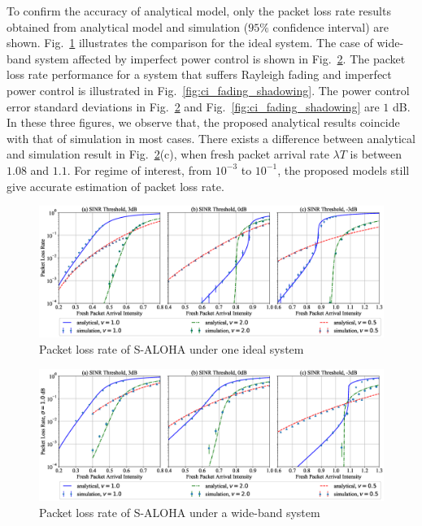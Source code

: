 To confirm the accuracy of analytical model, only the packet loss rate results obtained from analytical model and simulation ($95 \%$ confidence interval) are shown. Fig.~\ref{fig:ideal_ci} illustrates the comparison for the ideal system. The case of wide-band system affected by imperfect power control is shown in Fig.~\ref{fig:ci}. The packet loss rate performance for a system that suffers Rayleigh fading and imperfect power control is illustrated in Fig.~\ref{fig:ci_fading_shadowing}. The power control error standard deviations in Fig.~\ref{fig:ci} and Fig.~\ref{fig:ci_fading_shadowing} are $1$ dB.
In these three figures, we observe that, the proposed analytical results coincide with that of simulation in most cases. There exists a difference between analytical and simulation result in Fig.~\ref{fig:ci}(c), when fresh packet arrival rate $\lambda T$ is between $1.08$ and $1.1$. For regime of interest, from $10^{-3}$ to $10^{-1}$, the proposed models still give accurate estimation of packet loss rate.

\begin{figure}[!ht]
	\centering
	\includegraphics[width=1.0\linewidth]{Chapter4/Figures/packet_loss_rate_ci_with_ideal.eps}
	\caption{Packet loss rate of S-ALOHA under one ideal system}
	\label{fig:ideal_ci}
\end{figure}

\begin{figure}[!ht]
	\centering
	\includegraphics[width=1.0\linewidth]{Chapter4/Figures/packet_loss_rate_ci.eps}
	\caption{Packet loss rate of S-ALOHA under a wide-band system}
	\label{fig:ci}
\end{figure}

